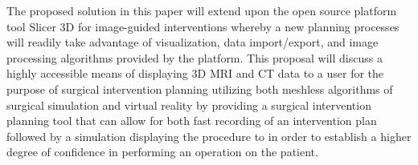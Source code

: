 The proposed solution in this paper will extend upon the open source platform tool Slicer 3D for image-guided interventions whereby a new planning processes will readily take advantage of visualization, data import/export, and image processing algorithms \cite{Ungi2016} provided by the platform. This proposal will discuss a highly accessible means of displaying 3D MRI and CT data to a user for the purpose of surgical intervention planning utilizing both meshless algorithms of surgical simulation and virtual reality by providing a surgical intervention planning tool that can allow for both fast recording of an intervention plan followed by a simulation displaying the procedure to in order to establish a higher degree of confidence in performing an operation on the patient.


